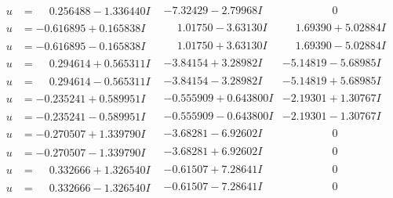 \documentclass[1p]{elsarticle_modified}
\theoremstyle{definition}
\begin{document}
$$\begin{array}{c|c|c}
\begin{aligned}
u &= \phantom{-}0.256488 - 1.336440 I\end{aligned}
 & -7.32429 - 2.79968 I & \phantom{-0.000000 } 0 \\ \hline\begin{aligned}
u &= -0.616895 + 0.165838 I\end{aligned}
 & \phantom{-}1.01750 - 3.63130 I & \phantom{-}1.69390 + 5.02884 I \\ \hline\begin{aligned}
u &= -0.616895 - 0.165838 I\end{aligned}
 & \phantom{-}1.01750 + 3.63130 I & \phantom{-}1.69390 - 5.02884 I \\ \hline\begin{aligned}
u &= \phantom{-}0.294614 + 0.565311 I\end{aligned}
 & -3.84154 + 3.28982 I & -5.14819 - 5.68985 I \\ \hline\begin{aligned}
u &= \phantom{-}0.294614 - 0.565311 I\end{aligned}
 & -3.84154 - 3.28982 I & -5.14819 + 5.68985 I \\ \hline\begin{aligned}
u &= -0.235241 + 0.589951 I\end{aligned}
 & -0.555909 + 0.643800 I & -2.19301 + 1.30767 I \\ \hline\begin{aligned}
u &= -0.235241 - 0.589951 I\end{aligned}
 & -0.555909 - 0.643800 I & -2.19301 - 1.30767 I \\ \hline\begin{aligned}
u &= -0.270507 + 1.339790 I\end{aligned}
 & -3.68281 - 6.92602 I & \phantom{-0.000000 } 0 \\ \hline\begin{aligned}
u &= -0.270507 - 1.339790 I\end{aligned}
 & -3.68281 + 6.92602 I & \phantom{-0.000000 } 0 \\ \hline\begin{aligned}
u &= \phantom{-}0.332666 + 1.326540 I\end{aligned}
 & -0.61507 + 7.28641 I & \phantom{-0.000000 } 0 \\ \hline\begin{aligned}
u &= \phantom{-}0.332666 - 1.326540 I\end{aligned}
 & -0.61507 - 7.28641 I & \phantom{-0.000000 } 0 \\ \hline\begin{aligned}

\end{aligned}
\end{array}$$
\end{document}
